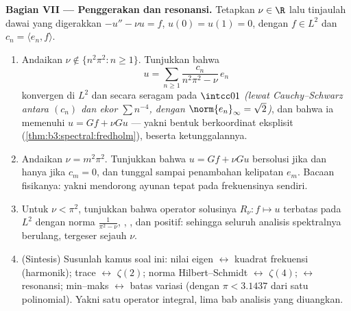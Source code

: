 \begin{problem}
\medskip
\noindent\textbf{Bagian VII --- Penggerakan dan resonansi.} Tetapkan
$\nu \in \R$ lalu tinjaulah dawai yang digerakkan $-u'' - \nu u =
f$, $u(0) = u(1) = 0$, dengan $f \in L^2$ dan $c_n = \langle
e_n, f\rangle$.
\begin{enumerate}[resume]
  \item Andaikan $\nu \notin \{n^2\pi^2 : n \geq 1\}$. Tunjukkan
        bahwa
        \[
        u = \sum_{n\geq1}\frac{c_n}{n^2\pi^2 - \nu}\,e_n
        \]
        konvergen di $L^2$ dan secara seragam pada $\intcc01$
        \emph{(lewat Cauchy--Schwarz antara $(c_n)$ dan ekor
        $\sum n^{-4}$, dengan $\norm{e_n}_\infty =
        \sqrt2$)}, dan bahwa ia memenuhi $u = Gf + \nu Gu$
        --- yakni bentuk berkoordinat eksplisit  (\cref{thm:b3:spectral:fredholm}), beserta
        ketunggalannya.
  \item Andaikan $\nu = m^2\pi^2$. Tunjukkan bahwa $u = Gf + \nu
        Gu$ bersolusi jika dan hanya jika $c_m = 0$, dan tunggal sampai
        penambahan kelipatan $e_m$. Bacaan fisikanya: yakni mendorong
        ayunan tepat pada frekuensinya sendiri.
  \item Untuk $\nu < \pi^2$, tunjukkan bahwa operator solusinya
        $R_\nu\colon f \mapsto u$ terbatas pada $L^2$ dengan
        norma $\frac1{\pi^2 - \nu}$, , ,
        dan positif: sehingga seluruh analisis spektralnya berulang,
        tergeser sejauh $\nu$.
  \item (Sintesis) Susunlah kamus soal ini:
        nilai eigen $\leftrightarrow$ kuadrat frekuensi
        (harmonik); trace $\leftrightarrow$ $\zeta(2)$;
        norma Hilbert--Schmidt $\leftrightarrow$ $\zeta(4)$;
         $\leftrightarrow$ resonansi;
        min--maks $\leftrightarrow$ batas variasi (dengan $\pi <
        3.1437$ dari satu polinomial). Yakni satu operator integral,
        lima bab analisis yang diuangkan.
\end{enumerate}


\end{problem}
